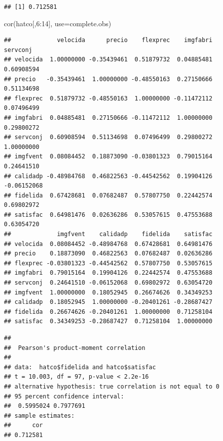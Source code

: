 \documentclass[
]{book}
\newenvironment{Shaded}{\begin{snugshade}}{\end{snugshade}}
\newcommand{\AttributeTok}[1]{\textcolor[rgb]{0.77,0.63,0.00}{#1}}
\newcommand{\DecValTok}[1]{\textcolor[rgb]{0.00,0.00,0.81}{#1}}
\newcommand{\FunctionTok}[1]{\textcolor[rgb]{0.00,0.00,0.00}{#1}}
\newcommand{\NormalTok}[1]{#1}
\newcommand{\SpecialCharTok}[1]{\textcolor[rgb]{0.00,0.00,0.00}{#1}}
\newcommand{\StringTok}[1]{\textcolor[rgb]{0.31,0.60,0.02}{#1}}
\theoremstyle{break}
\theoremstyle{nonumberplain}
\begin{document}
\begin{verbatim}
## [1] 0.712581
\end{verbatim}

\begin{Shaded}
\begin{Highlighting}[]
\FunctionTok{cor}\NormalTok{(hatco[,}\DecValTok{6}\SpecialCharTok{:}\DecValTok{14}\NormalTok{], }\AttributeTok{use=}\StringTok{\textquotesingle{}complete.obs\textquotesingle{}}\NormalTok{)}
\end{Highlighting}
\end{Shaded}

\begin{verbatim}
##             velocida      precio    flexprec    imgfabri    servconj
## velocida  1.00000000 -0.35439461  0.51879732  0.04885481  0.60908594
## precio   -0.35439461  1.00000000 -0.48550163  0.27150666  0.51134698
## flexprec  0.51879732 -0.48550163  1.00000000 -0.11472112  0.07496499
## imgfabri  0.04885481  0.27150666 -0.11472112  1.00000000  0.29800272
## servconj  0.60908594  0.51134698  0.07496499  0.29800272  1.00000000
## imgfvent  0.08084452  0.18873090 -0.03801323  0.79015164  0.24641510
## calidadp -0.48984768  0.46822563 -0.44542562  0.19904126 -0.06152068
## fidelida  0.67428681  0.07682487  0.57807750  0.22442574  0.69802972
## satisfac  0.64981476  0.02636286  0.53057615  0.47553688  0.63054720
##             imgfvent    calidadp    fidelida    satisfac
## velocida  0.08084452 -0.48984768  0.67428681  0.64981476
## precio    0.18873090  0.46822563  0.07682487  0.02636286
## flexprec -0.03801323 -0.44542562  0.57807750  0.53057615
## imgfabri  0.79015164  0.19904126  0.22442574  0.47553688
## servconj  0.24641510 -0.06152068  0.69802972  0.63054720
## imgfvent  1.00000000  0.18052945  0.26674626  0.34349253
## calidadp  0.18052945  1.00000000 -0.20401261 -0.28687427
## fidelida  0.26674626 -0.20401261  1.00000000  0.71258104
## satisfac  0.34349253 -0.28687427  0.71258104  1.00000000
\end{verbatim}

\begin{Shaded}
\end{Shaded}

\begin{verbatim}
## 
##  Pearson's product-moment correlation
## 
## data:  hatco$fidelida and hatco$satisfac
## t = 10.003, df = 97, p-value < 2.2e-16
## alternative hypothesis: true correlation is not equal to 0
## 95 percent confidence interval:
##  0.5995024 0.7977691
## sample estimates:
##      cor 
## 0.712581
\end{verbatim}
\end{document}
